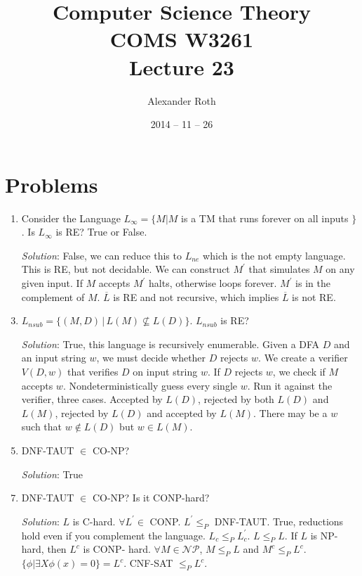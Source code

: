 \documentclass[]{article}
\begin{document}
\newtheorem{thm}{Theorem}
\title{Computer Science Theory \\ COMS W3261 \\ Lecture 23}
\author{Alexander Roth}
\date{2014 -- 11 -- 26}
\maketitle

\section*{Problems}
\begin{enumerate}
\item Consider the Language $L_\infty = \{ M | M$ is a TM that runs forever on
all inputs $\}$. Is $L_\infty$ is RE? True or False.
\item[\emph{Solution}:] False, we can reduce this to $L_{ne}$ which is the not
empty language. This is RE, but not decidable. We can construct $M^\prime$ that
simulates $M$ on any given input. If $M$ accepts $M^\prime$ halts, otherwise
loops forever. $M^\prime$ is in the complement of $M$. $\overline{L}$ is RE and
not recursive, which implies $\overline{L}$ is not RE.

\item $L_{nsub} = \{ (M, D)\,|\,L(M)\nsubseteq L(D) \}$. $L_{nsub}$ is RE?
\item[\emph{Solution}:] True, this language is recursively enumerable. Given a
DFA $D$ and an input string $w$, we must decide whether $D$ rejects $w$. We
create a verifier $V(D,w)$ that verifies $D$ on input string $w$. If $D$ rejects
$w$, we check if $M$ accepts $w$. Nondeterministically guess every single $w$.
Run it against the verifier, three cases. Accepted by $L(D)$, rejected by both
$L(D)$ and $L(M)$, rejected by $L(D)$ and accepted by $L(M)$.  There may be a
$w$ such that $w \not\in L(D)$ but $w \in L(M)$.

\item DNF-TAUT $\in$ CO-NP?
\item[\emph{Solution}:] True

\item DNF-TAUT $\in$ CO-NP? Is it CONP-hard?
\item[\emph{Solution}:] $L$ is C-hard. $\forall L^\prime \in$ CONP. $L^\prime
\leq_P$ DNF-TAUT. True, reductions hold even if you complement the language.
$L_c \leq_P L^\prime_c$. $L \leq_P L$. If $L$ is NP-hard, then $L^c$ is CONP-
hard. $\forall M \in \mathcal{NP}$, $M \leq_P L$ and $M^c \leq_P L^c$.
$\{\phi|\exists X \phi(x) = 0\} = L^c$. CNF-SAT $\leq_P L^c$.


\end{enumerate}
\end{document}
